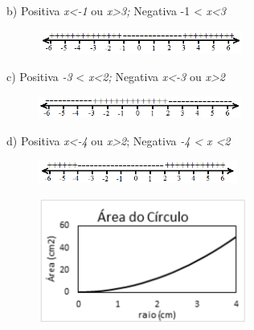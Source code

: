 \begin{enumerate}[label=\thechapter.\arabic*]
\begin{multicols}{2}
b) Positiva \textit{x<-1} ou  \textit{x>3; }Negativa -1 <  \textit{x<3}

\begin{figure}[H]
	\begin{Center}
		\includegraphics[width=2.66in,height=0.31in]{capitulos/funcao_do_segundo_grau/media/image33.png}
	\end{Center}
\end{figure}
\end{multicols}

\begin{multicols}{2}
c) Positiva \textit{-3} < \textit{x<2; }Negativa \textit{x<-3} ou \textit{x>2}

\begin{figure}[H]
	\begin{Center}
		\includegraphics[width=2.62in,height=0.29in]{capitulos/funcao_do_segundo_grau/media/image34.png}
	\end{Center}
\end{figure}
\end{multicols}

\begin{multicols}{2}
d) Positiva \textit{x<-4} ou \textit{x>2}; Negativa \textit{-4 < } \textit{x <2}

\begin{figure}[H]
	\begin{Center}
		\includegraphics[width=2.57in,height=0.3in]{capitulos/funcao_do_segundo_grau/media/image35.png}
	\end{Center}
\end{figure}
\end{multicols}

\ansitem{}

\begin{figure}[H]
	\begin{Center}
		\includegraphics[width=2.71in,height=1.63in]{capitulos/funcao_do_segundo_grau/media/image36.png}
	\end{Center}
\end{figure}


\end{enumerate}
